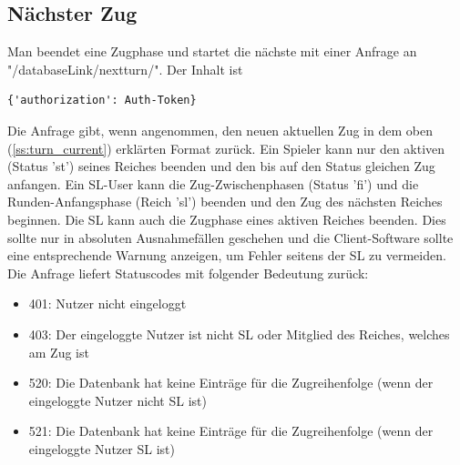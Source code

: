 \documentclass[11pt,a4paper,twocolumn]{article}
\begin{document}
\subsection{Nächster Zug}\label{ss:turn_next}
Man beendet eine Zugphase und startet die nächste mit einer Anfrage an "/databaseLink/nextturn/". Der Inhalt ist
\begin{lstlisting}
{'authorization': Auth-Token}
\end{lstlisting}
Die Anfrage gibt, wenn angenommen, den neuen aktuellen Zug in dem oben (\ref{ss:turn_current}) erklärten Format zurück. Ein Spieler kann nur den aktiven (Status 'st') seines Reiches beenden und den bis auf den Status gleichen Zug anfangen. Ein SL-User kann die Zug-Zwischenphasen (Status 'fi') und die Runden-Anfangsphase (Reich 'sl') beenden und den Zug des nächsten Reiches beginnen. Die SL kann auch die Zugphase eines aktiven Reiches beenden. Dies sollte nur in absoluten Ausnahmefällen geschehen und die Client-Software sollte eine entsprechende Warnung anzeigen, um Fehler seitens der SL zu vermeiden.\\
Die Anfrage liefert Statuscodes mit folgender Bedeutung zurück:
\begin{itemize}
\item 401: Nutzer nicht eingeloggt
\item 403: Der eingeloggte Nutzer ist nicht SL oder Mitglied des Reiches, welches am Zug ist
\item 520: Die Datenbank hat keine Einträge für die Zugreihenfolge (wenn der eingeloggte Nutzer nicht SL ist)
\item 521: Die Datenbank hat keine Einträge für die Zugreihenfolge (wenn der eingeloggte Nutzer SL ist)
\end{itemize}
\end{document}
